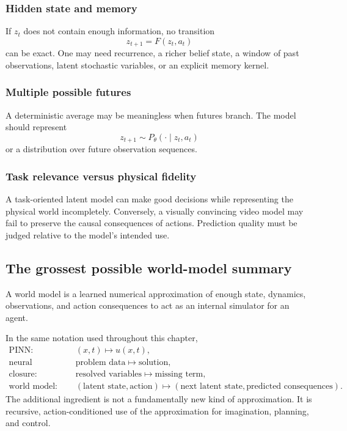 \documentclass[11pt]{article}
\begin{document}
\subsubsection{Hidden state and memory}

If \(z_t\) does not contain enough information, no transition
\[
 z_{t+1}=F(z_t,a_t)
\]
can be exact. One may need recurrence, a richer belief state, a window of past observations, latent stochastic variables, or an explicit memory kernel.

\subsubsection{Multiple possible futures}

A deterministic average may be meaningless when futures branch. The model should represent
\[
 z_{t+1}\sim P_\theta(\cdot\mid z_t,a_t)
\]
or a distribution over future observation sequences.

\subsubsection{Task relevance versus physical fidelity}

A task-oriented latent model can make good decisions while representing the physical world incompletely. Conversely, a visually convincing video model may fail to preserve the causal consequences of actions. Prediction quality must be judged relative to the model's intended use.

\subsection{The grossest possible world-model summary}

\begin{bigidea}
A world model is a learned numerical approximation of enough state, dynamics, observations, and action consequences to act as an internal simulator for an agent.
\end{bigidea}

In the same notation used throughout this chapter,
\begin{equation}
\begin{aligned}
\text{PINN:}
&\quad (x,t)\longmapsto u(x,t),\\
\text{neural operator:}
&\quad \text{problem data}\longmapsto\text{solution},\\
\text{closure:}
&\quad \text{resolved variables}\longmapsto\text{missing term},\\
\text{world model:}
&\quad (\text{latent state},\text{action})
\longmapsto
(\text{next latent state},\text{predicted consequences}).
\end{aligned}
\end{equation}
The additional ingredient is not a fundamentally new kind of approximation. It is recursive, action-conditioned use of the approximation for imagination, planning, and control.
\end{document}
